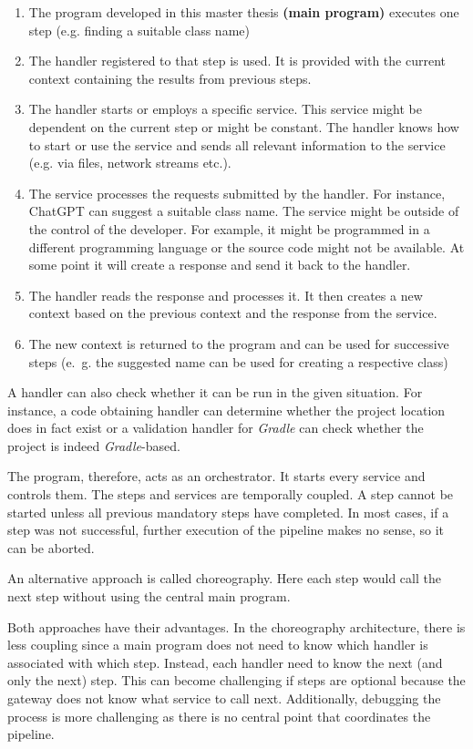 \begin{enumerate}
    \item The program developed in this master thesis \textbf{(main program)} executes one step (e.g. finding a suitable class name)
    \item The handler registered to that step is used. It is provided with the current context containing the results from previous steps.
    \item The handler starts or employs a specific service. This service might be dependent on the current step or might be constant. The handler knows how to start or use the service and sends all relevant information to the service (e.g. via files, network streams etc.). 
    \item The service processes the requests submitted by the handler. For instance, ChatGPT can suggest a suitable class name. The service might be outside of the control of the developer. For example, it might be programmed in a different programming language or the source code might not be available. At some point it will create a response and send it back to the handler. 
    \item The handler reads the response and processes it. It then creates a new context based on the previous context and the response from the service. 
    \item The new context is returned to the program and can be used for successive steps (e.~g. the suggested name can be used for creating a respective class) 
\end{enumerate}



A handler can also check whether it can be run in the given situation. For instance, a code obtaining handler can determine whether the project location does in fact exist or a validation handler for \textit{Gradle} can check whether the project is indeed \textit{Gradle}-based.

The program, therefore, acts as an orchestrator. It starts every service and controls them. The steps and services are temporally coupled. A step cannot be started unless all previous mandatory steps have completed. In most cases, if a step was not successful, further execution of the pipeline makes no sense, so it can be aborted. 

An alternative approach is called choreography. Here each step would call the next step without using the central main program. 

Both approaches have their advantages. In the choreography architecture, there is less coupling since a main program does not need to know which handler is associated with which step. Instead, each handler need to know the next (and only the next) step. This can become challenging if steps are optional because the gateway does not know what service to call next. Additionally, debugging the process is more challenging as there is no central point that coordinates the pipeline.

